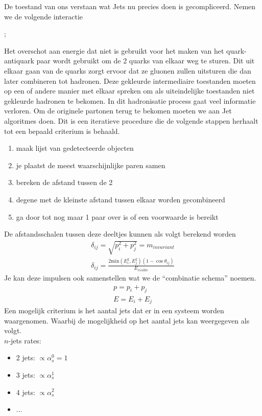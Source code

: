 \documentclass[../main.tex]{subfiles}
\begin{document}
De toestand van ons verstaan wat Jets nu precies doen is gecompliceerd. Nemen we de volgende interactie\\
\begin{center}
;
\end{center}
Het overschot aan energie dat niet is gebruikt voor het maken van het quark-antiquark paar wordt gebruikt om de 2 quarks van elkaar weg te sturen. Dit uit elkaar gaan van de quarks zorgt ervoor dat ze gluonen zullen uitsturen die dan later combineren tot hadronen. Deze gekleurde intermediaire toestanden moeten op een of andere manier met elkaar spreken om als uiteindelijke toestanden niet gekleurde hadronen te bekomen. In dit hadronisatie process gaat veel informatie verloren. Om de originele partonen terug te bekomen moeten we aan Jet algoritmes doen. Dit is een iteratieve procedure die de volgende stappen herhaalt tot een bepaald criterium is behaald.
\begin{enumerate}
    \item maak lijst van gedetecteerde objecten
    \item je plaatst de meest waarschijnlijke paren samen
    \item bereken de afstand tussen de 2
    \item degene met de kleinste afstand tussen elkaar worden gecombineerd
    \item ga door tot nog maar 1 paar over is of een voorwaarde is bereikt
\end{enumerate}
De afstandsschalen tussen deze deeltjes kunnen als volgt berekend worden
\begin{equation}
    \begin{aligned}
        \label{eq:jet_alg_afstand}
        \delta_{ij} = \sqrt{p_i^2+p_j^2} = m_{invariant}\\
        \delta_{ij} = \frac{2\text{min}(E_i^2,E_j^2)(1-\cos\theta_{ij})}{E_{visible}} 
    \end{aligned}
\end{equation}
Je kan deze impulsen ook samenstellen wat we de ``combinatie schema'' noemen.
\begin{equation}
    \begin{aligned}
        \label{eq:comb_scheme}
        p=p_i+p_j\\
        E=E_i+E_j
    \end{aligned}
\end{equation}
Een mogelijk criterium is het aantal jets dat er in een systeem worden waargenomen. Waarbij de mogelijkheid op het aantal jets kan weergegeven als volgt.\\
$n$-jets rates:
\begin{itemize}
    \item 2 jets: $\propto \alpha_s^0 = 1$
    \item 3 jets: $\propto \alpha_s^1$
    \item 4 jets: $\propto \alpha_s^2$
    \item ...
\end{itemize}
\end{document}
